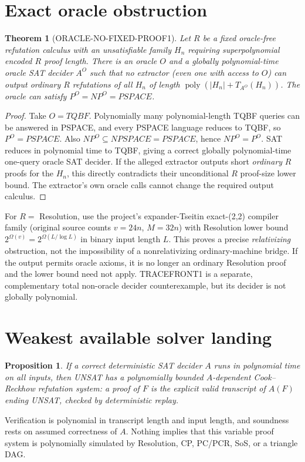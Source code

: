 \documentclass[11pt]{article}
\newtheorem{theorem}{Theorem}
\newtheorem{proposition}{Proposition}
\begin{document}
\section{Exact oracle obstruction}
\begin{theorem}[ORACLE-NO-FIXED-PROOF1]
Let $R$ be a fixed oracle-free refutation calculus with an unsatisfiable family $H_n$ requiring superpolynomial \emph{encoded} $R$ proof length. There is an oracle $O$ and a globally polynomial-time oracle SAT decider $A^O$ such that no extractor (even one with access to $O$) can output ordinary $R$ refutations of all $H_n$ of length $\operatorname{poly}(|H_n|+T_{A^O}(H_n))$. The oracle can satisfy $P^O=NP^O=PSPACE$.
\end{theorem}
\begin{proof}
Take $O=TQBF$. Polynomially many polynomial-length TQBF queries can be answered in PSPACE, and every PSPACE language reduces to TQBF, so $P^O=PSPACE$. Also $NP^O\subseteq NPSPACE=PSPACE$, hence $NP^O=P^O$. SAT reduces in polynomial time to TQBF, giving a correct globally polynomial-time one-query oracle SAT decider. If the alleged extractor outputs short \emph{ordinary} $R$ proofs for the $H_n$, this directly contradicts their unconditional $R$ proof-size lower bound. The extractor's own oracle calls cannot change the required output calculus.
\end{proof}
For $R=$ Resolution, use the project's expander-Tseitin exact-(2,2) compiler family (original source counts $v=24n$, $M=32n$) with Resolution lower bound $2^{\Omega(v)}=2^{\Omega(L/\log L)}$ in binary input length $L$. This proves a precise \emph{relativizing} obstruction, not the impossibility of a nonrelativizing ordinary-machine bridge. If the output permits oracle axioms, it is no longer an ordinary Resolution proof and the lower bound need not apply. TRACEFRONT1 is a separate, complementary total non-oracle decider counterexample, but its decider is not globally polynomial.

\section{Weakest available solver landing}
\begin{proposition}
If a correct deterministic SAT decider $A$ runs in polynomial time on \emph{all} inputs, then UNSAT has a polynomially bounded \emph{$A$-dependent} Cook--Reckhow refutation system: a proof of $F$ is the explicit valid transcript of $A(F)$ ending UNSAT, checked by deterministic replay.
\end{proposition}
Verification is polynomial in transcript length and input length, and soundness rests on assumed correctness of $A$. Nothing implies that this variable proof system is polynomially simulated by Resolution, CP, PC/PCR, SoS, or a triangle DAG.
\end{document}
